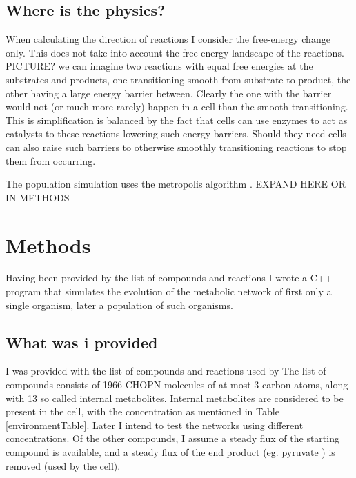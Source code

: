 \documentclass[10pt,a4paper]{article}
\begin{document}
	\subsection{Where is the physics?}\label{chap:whereisphysics}
	
	When calculating the direction of reactions I consider the free-energy change only. This does not take into account the free energy landscape of the reactions. PICTURE? we can imagine two reactions with equal free energies at the substrates and products, one transitioning smooth from substrate to product, the other having a large energy barrier between. Clearly the one with the barrier would not (or much more rarely) happen in a cell than the smooth transitioning. This is simplification is balanced by the fact that cells can use enzymes to act as catalysts to these reactions lowering such energy barriers. Should they need cells can also raise such barriers to otherwise smoothly transitioning reactions to stop them from occurring. 
	
	The population simulation uses the metropolis algorithm \cite{metropolisalgorithm}. EXPAND HERE OR IN METHODS


	
	\section{Methods}
	
	Having been provided by the list of compounds and reactions I wrote a C++ program that simulates the evolution of the metabolic network of first only a single organism, later a population of such organisms. 
	
	\subsection{What was i provided}\label{chap:whatwasprovided}
	
	I was provided with the list of compounds and reactions used by \citeauthor{BartekLower} The list of compounds consists of 1966 CHOPN molecules of at most 3 carbon atoms, along with 13 so called internal metabolites. Internal metabolites are considered to be present in the cell, with the concentration as mentioned in Table \ref{environmentTable}. Later I intend to test the networks using different concentrations. Of the other compounds, I assume a steady flux of the starting compound is available, and a steady flux of the end product (eg. pyruvate ) is removed (used by the cell). 
	
\end{document}
